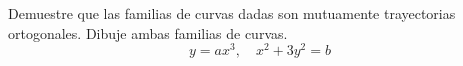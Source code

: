 \item Demuestre que las familias de curvas dadas son mutuamente trayectorias ortogonales. Dibuje ambas familias de curvas.
$$y = ax^3, \quad x^2 + 3y^2 = b$$
